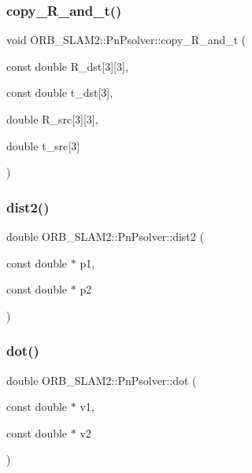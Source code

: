 \subsubsection{\texorpdfstring{copy\+\_\+\+R\+\_\+and\+\_\+t()}{copy\_R\_and\_t()}}
{\footnotesize\ttfamily void O\+R\+B\+\_\+\+S\+L\+A\+M2\+::\+Pn\+Psolver\+::copy\+\_\+\+R\+\_\+and\+\_\+t (\begin{DoxyParamCaption}\item[{const double}]{R\+\_\+dst\mbox{[}3\mbox{]}\mbox{[}3\mbox{]},  }\item[{const double}]{t\+\_\+dst\mbox{[}3\mbox{]},  }\item[{double}]{R\+\_\+src\mbox{[}3\mbox{]}\mbox{[}3\mbox{]},  }\item[{double}]{t\+\_\+src\mbox{[}3\mbox{]} }\end{DoxyParamCaption})\hspace{0.3cm}{\ttfamily [private]}}

\mbox{\label{class_o_r_b___s_l_a_m2_1_1_pn_psolver_af117c07b4d7b9b5990f98f33d19482d3}} 
\subsubsection{\texorpdfstring{dist2()}{dist2()}}
{\footnotesize\ttfamily double O\+R\+B\+\_\+\+S\+L\+A\+M2\+::\+Pn\+Psolver\+::dist2 (\begin{DoxyParamCaption}\item[{const double $\ast$}]{p1,  }\item[{const double $\ast$}]{p2 }\end{DoxyParamCaption})\hspace{0.3cm}{\ttfamily [private]}}

\mbox{\label{class_o_r_b___s_l_a_m2_1_1_pn_psolver_afd58911fc21c6255ac5c541b8e4540ac}} 
\subsubsection{\texorpdfstring{dot()}{dot()}}
{\footnotesize\ttfamily double O\+R\+B\+\_\+\+S\+L\+A\+M2\+::\+Pn\+Psolver\+::dot (\begin{DoxyParamCaption}\item[{const double $\ast$}]{v1,  }\item[{const double $\ast$}]{v2 }\end{DoxyParamCaption})\hspace{0.3cm}{\ttfamily [private]}}

